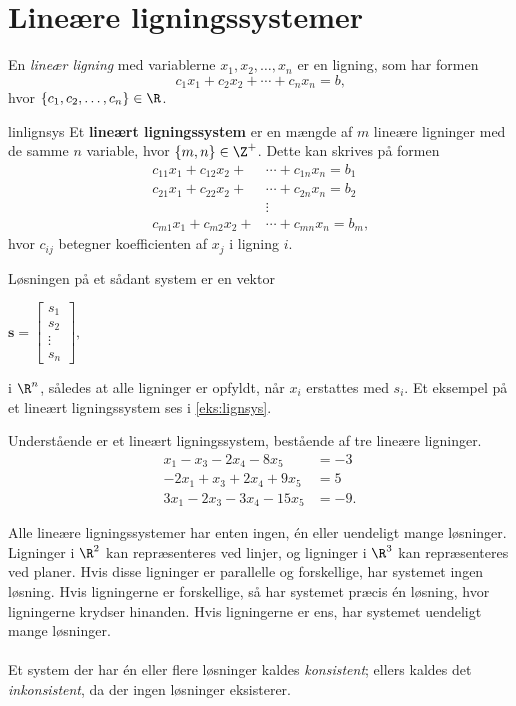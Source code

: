 \section{Lineære ligningssystemer }
%
En \textit{lineær ligning} med variablerne $x_1,x_2,\ldots ,x_n$ er en ligning, som har formen
$$ c_1x_1+c_2x_2+\cdots+c_nx_n=b \text{,}$$ 
hvor $\{c_1,c_2,\ldots,c_n\} \in \R$. 
%
\begin{defn}{}{linlignsys}
Et \textbf{lineært ligningssystem} er en mængde af $m$ lineære ligninger med de samme $n$ variable, hvor $\{m, n\} \in \Z^+$.
Dette kan skrives på formen
\begin{align*}
c_{11}x_1+c_{12}x_2+&\cdots+c_{1n}x_n=b_1\\
c_{21}x_1+c_{22}x_2+&\cdots+c_{2n}x_n=b_2\\
&\vdots\\
c_{m1}x_1+c_{m2}x_2+&\cdots +c_{mn}x_n=b_m
\text{,}
\end{align*}
hvor $c_{ij}$ betegner koefficienten af $x_j$ i ligning $i$.
\end{defn}
\noindent
Løsningen på et sådant system er en vektor
\begin{center}
$
\mathbf{s} = 
\begin{bmatrix}
s_1\\
s_2\\
\vdots\\
s_n
\end{bmatrix},
$
\end{center}
i $\R ^n$, således at alle ligninger er opfyldt, når $x_i$ erstattes med $s_i$. Et eksempel på et lineært ligningssystem ses i \ref{eks:lignsys}.
%
\\
%
\begin{eks}
\label{eks:lignsys}
Understående er et lineært ligningssystem, bestående af tre lineære ligninger.
%
\begin{align*}
x_1-x_3-2x_4-8x_5&=-3 \\
-2x_1+x_3+2x_4+9x_5&=5 \\
3x_1-2x_3-3x_4-15x_5&=-9.
\end{align*}
%
%
%
\end{eks}
%
Alle lineære ligningssystemer har enten ingen, én eller uendeligt mange løsninger.
Ligninger i $\R^2$ kan repræsenteres ved linjer, og ligninger i $\R^3$ kan repræsenteres ved planer.
Hvis disse ligninger er parallelle og forskellige, har systemet ingen løsning.
Hvis ligningerne er forskellige, så har systemet præcis én løsning, hvor ligningerne krydser hinanden. 
Hvis ligningerne er ens, har systemet uendeligt mange løsninger.
\\\\
%
Et system der har én eller flere løsninger kaldes \textit{konsistent}; ellers kaldes det \textit{inkonsistent}, da der ingen løsninger eksisterer.
%
%
